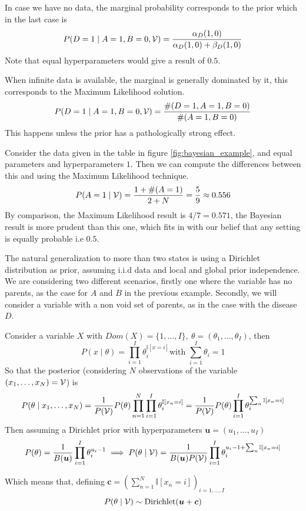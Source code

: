 In case we have no data, the marginal probability corresponds to the prior which
in the last case is
\[
   P(D = 1 \mid A = 1, B = 0, \mathcal{V}) = \frac{\alpha_{D}(1,0)}{\alpha_{D}(1,0) + \beta_{D}(1,0)}
 \]
 Note that equal hyperparameters would give a result of \(0.5\).

 When infinite data is available, the marginal is generally dominated by it,
 this corresponds to the Maximum Likelihood solution.
 \[
   P(D = 1 \mid A = 1, B = 0, \mathcal{V}) = \frac{\#(D = 1, A = 1 , B = 0)}{\#(A = 1, B = 0)}
 \]
 This happens unless the prior has a pathologically strong effect.

 Consider the data given in the table in figure \ref{fig:bayesian_example}, and
 equal parameters and hyperparameters \(1\). Then we can compute the differences
 between this and using the Maximum Likelihood technique.
 \[
   P(A = 1 \mid \mathcal{V}) = \frac{1 + \#(A = 1)}{2 + N} = \frac{5}{9} \approx 0.556
 \]
 By comparison, the Maximum Likelihood result is \(4/7 = 0.571\), the Bayesian
 result is more prudent than this one, which fits in with our belief that any
 setting is equally probable i.e \(0.5\).


 The natural generalization to more than two states is using a Dirichlet
 distribution as prior, assuming i.i.d data and local and global prior
 independence. We are considering two different scenarios, firstly one where the
 variable has no parents, as the case for \(A\) and \(B\) in the previous
 example. Secondly, we will consider a variable with a non void set of parents,
 as in the case with the disease \(D\).

 Consider a variable \(X\) with
 \(Dom(X) = \{1, \dots, I\}, \ \theta = (\theta_{1},\dots, \theta_{I})\), then
 \[
   P(x \mid \theta) = \prod_{i = 1}^{I}\theta_{i}^{\mathbb{I}[x = i]} \text{
   with  } \sum_{i=1}^{I}\theta_{i} = 1
\]
So that the posterior (considering \(N\) observations of the variable
\((x_{1}, \dots, x_{N}) = \mathcal{V}\)) is
\[
  P(\theta \mid x_{1},\dots,x_{N}) = \frac{1}{P(\mathcal{V})} P(\theta) \prod_{n = 1}^{N}\prod_{i =1 }^{I}\theta_{i}^{\mathbb{I}[x_{n} = i]} =  \frac{1}{P(\mathcal{V})} P(\theta) \prod_{i = 1}^{I} \theta_{i}^{\sum_{n} \mathbb{I}[x_{n}=i]}
\]
Then assuming a Dirichlet prior with hyperparameters \(\bm{u} = (u_{1}, \dots, u_{I})\)
\[
  P(\theta) = \frac{1}{B(\bm{u})}\prod_{i =1}^{I}\theta_{i}^{u_{i}-1} \implies P(\theta \mid \mathcal{V}) = \frac{1}{B(\bm{u})P(\mathcal{V})}\prod_{i=1}^{I}\theta_{i}^{u_{i}-1 + \sum_{n}\mathbb{I}[x_{n} = i]}
\]

Which means that, defining \(\bm{c} = ( \sum_{n=1}^{N}\mathbb{I}[x_{n} = i])_{i = 1,\dots,I}\)
\[
  P(\theta \mid \mathcal{V}) \sim \text{Dirichlet}(\bm{u} + \bm{c})
\]

